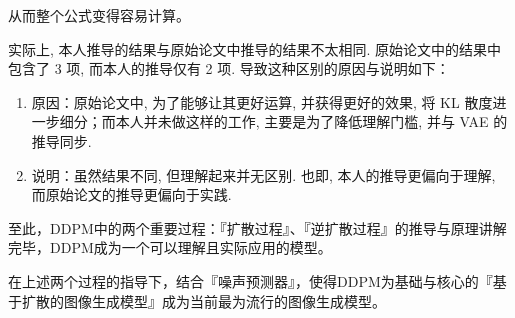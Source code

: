 从而整个公式变得容易计算。

实际上, 本人推导的结果与原始论文中推导的结果不太相同. 原始论文中的结果中包含了 3 项, 而本人的推导仅有 2 项. 导致这种区别的原因与说明如下：

\begin{enumerate}
    \item 原因：原始论文中, 为了能够让其更好运算, 并获得更好的效果, 将 KL 散度进一步细分；而本人并未做这样的工作, 主要是为了降低理解门槛, 并与 VAE 的推导同步.
    \item 说明：虽然结果不同, 但理解起来并无区别. 也即, 本人的推导更偏向于理解, 而原始论文的推导更偏向于实践.
\end{enumerate}

至此，DDPM\cite{hoDenoisingDiffusionProbabilistic2020a}中的两个重要过程：『扩散过程』、『逆扩散过程』的推导与原理讲解完毕，DDPM\cite{hoDenoisingDiffusionProbabilistic2020a}成为一个可以理解且实际应用的模型。

在上述两个过程的指导下，结合『噪声预测器』，使得DDPM\cite{hoDenoisingDiffusionProbabilistic2020a}为基础与核心的『基于扩散的图像生成模型』成为当前最为流行的图像生成模型。